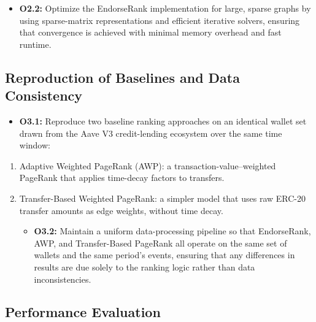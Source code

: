 \documentclass[
]{article}
\begin{document}
\begin{itemize}
\item
  \textbf{O2.2:} Optimize the EndorseRank implementation for large, sparse graphs by using sparse-matrix representations and efficient iterative solvers, ensuring that convergence is achieved with minimal memory overhead and fast runtime.
\end{itemize}

\subsection{Reproduction of Baselines and Data Consistency}\label{reproduction-of-baselines-and-data-consistency}

\begin{itemize}
\item
  \textbf{O3.1:} Reproduce two baseline ranking approaches on an identical wallet set drawn from the Aave V3 credit-lending ecosystem over the same time window:
\end{itemize}

\begin{enumerate}
\def\labelenumi{(\alph{enumi})}
\item
  Adaptive Weighted PageRank (AWP): a transaction-value--weighted PageRank that applies time-decay factors to transfers.
\item
  Transfer-Based Weighted PageRank: a simpler model that uses raw ERC-20 transfer amounts as edge weights, without time decay.

  \begin{itemize}
  \item
    \textbf{O3.2:} Maintain a uniform data-processing pipeline so that EndorseRank, AWP, and Transfer-Based PageRank all operate on the same set of wallets and the same period's events, ensuring that any differences in results are due solely to the ranking logic rather than data inconsistencies.
  \end{itemize}
\end{enumerate}

\subsection{Performance Evaluation}\label{performance-evaluation}
\end{document}
